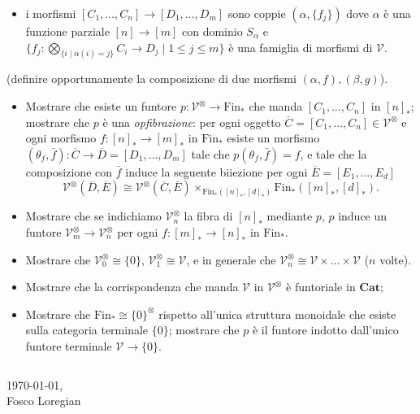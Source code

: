 \documentclass[a4paper,10pt]{amsart}
\def\V{\mathcal{V}}
\def\Cat{\mathbf{Cat}}
\begin{document}
\begin{itemize}
\begin{itemize}
		\item i morfismi $[C_1,\dots, C_n]\to [D_1,\dots,D_m]$ sono coppie $(\alpha,\{f_j\})$ dove $\alpha$ è una funzione parziale $[n]\to [m]$ con dominio $S_\alpha$ e $\{f_j : \bigotimes_{\{i\mid \alpha(i)=j\}} C_i\to D_j \mid 1\le j\le m\}$ è una famiglia di morfismi di $\V$.
	\end{itemize}
	(definire opportunamente la composizione di due morfismi $(\alpha,f), (\beta,g)$). 
	\begin{itemize}
		\item Mostrare che esiste un funtore $p : \V^\otimes\to \text{Fin}_*$ che manda $[C_1,\dots,C_n]$ in $[n]_*$; mostrare che $p$ è una \emph{opfibrazione}: per ogni oggetto $\overline C= [C_1,\dots,C_n]\in\V^\otimes$ e ogni morfismo $f : [n]_* \to [m]_*$ in $\text{Fin}_*$ esiste un morfismo $(\theta_f,\bar f) : \overline C \to \overline D = [D_1,\dots, D_m]$ tale che $p(\theta_f,\bar f)=f$, e tale che la composizione con $\bar f$ induce la seguente biiezione per ogni $\overline E = [E_1,\dots,E_d]$ 
		\[\V^\otimes(\overline D, \overline E) \cong \V^\otimes(\overline C, \overline E) \times_{\text{Fin}_*([n]_*, [d]_*)}\text{Fin}_*([m]_*, [d]_*).\]
		\item Mostrare che se indichiamo $\V^\otimes_n$ la fibra di $[n]_*$ mediante $p$, $p$ induce un funtore $\V^\otimes_m \to \V^\otimes_n$ per ogni $f : [m]_* \to [n]_*$ in $\text{Fin}_*$.
		\item Mostrare che $\V^\otimes_0 \cong \{0\}$, $\V^\otimes_1 \cong \V$, e in generale che $\V^\otimes_n \cong \V\times\dots\times\V$ ($n$ volte).
		\item Mostrare che la corrispondenza che manda $\V$ in $\V^\otimes$ è funtoriale in $\Cat$; 
		\item Mostrare che $\text{Fin}_* \cong \{0\}^\otimes$ rispetto all'unica struttura monoidale che esiste sulla categoria terminale $\{0\}$; mostrare che $p$ è il funtore indotto dall'unico funtore terminale $\V \to \{0\}$.
	\end{itemize}
	\[  \]
\end{itemize}

\vspace{\fill}
\begin{flushright}
\today,\\
Fosco Loregian
\end{flushright}
\end{document}
